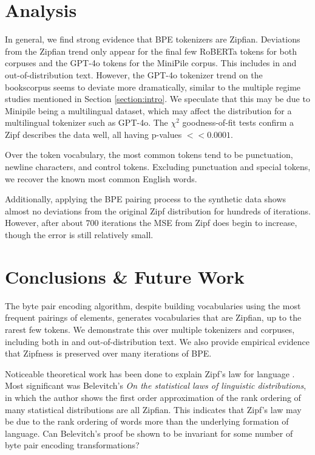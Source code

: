 \documentclass[11pt]{article}
\begin{document}
\section{Analysis}

In general, we find strong evidence that BPE tokenizers are Zipfian. Deviations from the Zipfian trend only appear for the final few RoBERTa tokens for both corpuses and the GPT-4o tokens for the MiniPile corpus. This includes in and out-of-distribution text. However, the GPT-4o tokenizer trend on the bookscorpus seems to deviate more dramatically, similar to the multiple regime studies mentioned in Section \ref{section:intro}. We speculate that this may be due to Minipile being a multilingual dataset, which may affect the distribution for a multilingual tokenizer such as GPT-4o. The $\chi^2$ goodness-of-fit tests confirm a Zipf describes the data well, all having p-values $<<0.0001$. 

Over the token vocabulary, the most common tokens tend to be punctuation, newline characters, and control tokens. Excluding punctuation and special tokens, we recover the known most common English words.

Additionally, applying the BPE pairing process to the synthetic data shows almost no deviations from the original Zipf distribution for hundreds of iterations. However, after about $700$ iterations the MSE from Zipf does begin to increase, though the error is still relatively small.

\section{Conclusions \& Future Work}

The byte pair encoding algorithm, despite building vocabularies using the most frequent pairings of elements, generates vocabularies that are Zipfian, up to the rarest few tokens. We demonstrate this over multiple tokenizers and corpuses, including both in and out-of-distribution text. We also provide empirical evidence that Zipfness is preserved over many iterations of BPE.

Noticeable theoretical work has been done to explain Zipf's law for language \cite{li1992}. Most significant was Belevitch's \textit{On the statistical laws of linguistic distributions}\cite{Belevitch1959}, in which the author shows the first order approximation of the rank ordering of many statistical distributions are all Zipfian. This indicates that Zipf's law may be due to the rank ordering of words more than the underlying formation of language. Can Belevitch's proof be shown to be invariant for some number of byte pair encoding transformations?

%




\end{document}
